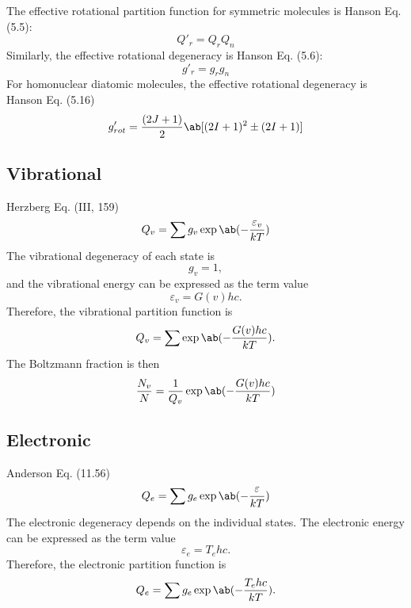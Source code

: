 \documentclass[11pt, twoside, fleqn]{report}
\begin{document}
The effective rotational partition function for symmetric molecules is Hanson Eq. (5.5):
\begin{equation*}
    Q'_{r} = Q_{r}Q_{n}
\end{equation*}
Similarly, the effective rotational degeneracy is Hanson Eq. (5.6):
\begin{equation*}
    g'_{r} = g_{r}g_{n}
\end{equation*}
For homonuclear diatomic molecules, the effective rotational degeneracy is Hanson Eq. (5.16)
\begin{equation*}
    g'_{rot} = \frac{(2J + 1)}{2}\ab[(2I + 1)^{2} \pm (2I + 1)]
\end{equation*}

\subsection{Vibrational}

Herzberg Eq. (III, 159)
\begin{equation*}
    Q_{v} = \sum g_{v}\exp\ab(-\frac{\varepsilon_{v}}{kT})
\end{equation*}
The vibrational degeneracy of each state is
\begin{equation*}
    g_{v} = 1,
\end{equation*}
and the vibrational energy can be expressed as the term value
\begin{equation*}
    \varepsilon_{v} = G(v)hc.
\end{equation*}
Therefore, the vibrational partition function is
\begin{equation*}
    Q_{v} = \sum \exp\ab(-\frac{G(v)hc}{kT}).
\end{equation*}
The Boltzmann fraction is then
\begin{equation*}
    \frac{N_{v}}{N} = \frac{1}{Q_{v}}\exp\ab(-\frac{G(v)hc}{kT})
\end{equation*}

\subsection{Electronic}

Anderson Eq. (11.56)
\begin{equation*}
    Q_{e} = \sum g_{e}\exp\ab(-\frac{\varepsilon}{kT})
\end{equation*}
The electronic degeneracy depends on the individual states. The electronic energy can be expressed as the term value
\begin{equation*}
    \varepsilon_{e} = T_{e}hc.
\end{equation*}
Therefore, the electronic partition function is
\begin{equation*}
    Q_{e} = \sum g_{e}\exp\ab(-\frac{T_{e}hc}{kT}).
\end{equation*}
\end{document}
